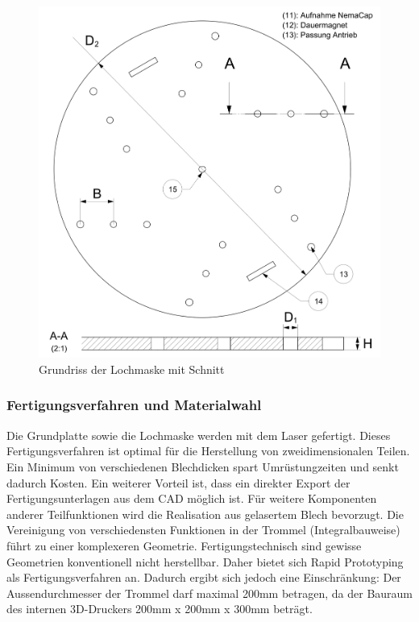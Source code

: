 	\begin{figure}[H]
	\includegraphics[scale=0.65]{Illustrationen/6-Umsetzung/detail_lochmaske.jpg}
	\caption{Grundriss der Lochmaske mit Schnitt}
	\label{fig:detail_lochmaske}
	\end{figure}
\subsubsection{Fertigungsverfahren und Materialwahl}
 Die Grundplatte sowie die Lochmaske werden mit dem Laser gefertigt. Dieses Fertigungsverfahren ist optimal für die Herstellung von zweidimensionalen Teilen. Ein Minimum von verschiedenen Blechdicken spart Umrüstungzeiten und senkt dadurch Kosten. Ein weiterer Vorteil ist, dass ein direkter Export der Fertigungsunterlagen aus dem CAD möglich ist. Für weitere Komponenten anderer Teilfunktionen wird die Realisation aus gelasertem Blech bevorzugt.
\newline
\newline
Die Vereinigung von verschiedensten Funktionen in der Trommel (Integralbauweise) führt zu einer komplexeren Geometrie. Fertigungstechnisch sind gewisse Geometrien konventionell nicht herstellbar. Daher bietet sich Rapid Prototyping als Fertigungsverfahren an. Dadurch ergibt sich jedoch eine Einschränkung: Der Aussendurchmesser der Trommel darf maximal 200mm betragen, da der Bauraum des internen 3D-Druckers 200mm x 200mm x 300mm beträgt. 